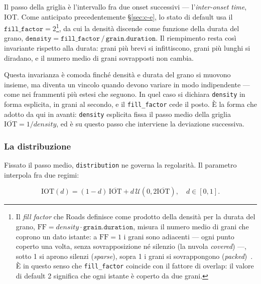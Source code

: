 Il passo della griglia è l'intervallo fra due onset successivi ---
l'\emph{inter-onset time}, IOT\cite{Truax1988}. 
Come anticipato precedentemente \S\ref{sec:c-e}, lo stato di default
usa il $\texttt{fill\_factor} = 2$\footnote{Il \emph{fill factor} che Roads definisce come prodotto della
densità per la durata del grano, $\mathrm{FF} = \mathit{density}\cdot
\texttt{grain.duration}$, misura il numero medio di grani che coprono un
dato istante: a $\mathrm{FF}=1$ i grani sono adiacenti --- ogni punto
coperto una volta, senza sovrapposizione né silenzio (la nuvola
\emph{covered}) ---, sotto 1 si aprono silenzi (\emph{sparse}), sopra 1
i grani si sovrappongono (\emph{packed})~\cite[pp.~105--106]{Roads2001}.
È in questo senso che \texttt{fill\_factor} coincide con il fattore di
overlap: il valore di default 2 significa che ogni istante è coperto da
due grani.}, da cui
la densità discende come funzione della durata del grano,
$\texttt{density} = \texttt{fill\_factor}\,/\,\texttt{grain.duration}$.
Il riempimento resta così invariante rispetto alla durata: grani più
brevi si infittiscono, grani più lunghi si diradano, e il numero medio
di grani sovrapposti non cambia.

Questa invarianza è comoda finché densità e durata del grano si muovono
insieme, ma diventa un vincolo quando devono variare in modo
indipendente --- come nei frammenti più estesi che seguono. In quel
caso si dichiara \texttt{density} in forma esplicita, in grani al
secondo, e il \texttt{fill\_factor} cede il posto. È la forma che adotto
da qui in avanti: \texttt{density} esplicita fissa il passo medio della
griglia $\overline{\mathrm{IOT}} = 1/\mathit{density}$, ed è su questo
passo che interviene la deviazione successiva.

\subsubsection{La distribuzione}

Fissato il passo medio, \texttt{distribution} ne governa la regolarità.
Il parametro interpola fra due regimi:

\begin{equation}\label{eq:iot}
  \mathrm{IOT}(d) = (1-d)\,\overline{\mathrm{IOT}} + d\,\mathcal{U}\!\left(0, 2\overline{\mathrm{IOT}}\right), \quad d \in [0,1].
\end{equation}

